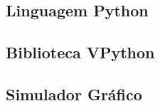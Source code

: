 \subsection{Linguagem Python}





\subsection{Biblioteca VPython}






\subsection{Simulador Gráfico}